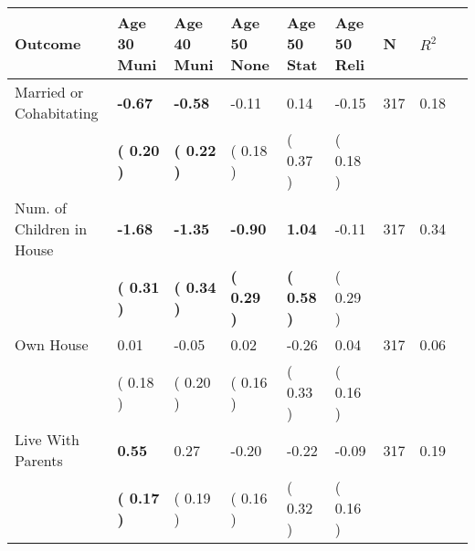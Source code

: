 \begin{tabular}{L{6.2cm} C{1.8cm} C{1.8cm} C{1.8cm} C{1.8cm} C{1.8cm} C{1.8cm} C{0.3cm} C{0.3cm}}
\toprule
 \textbf{Outcome} & \textbf{Age 30 Muni} & \textbf{Age 40 Muni} & \textbf{Age 50 None} & \textbf{Age 50 Stat} & \textbf{Age 50 Reli} & \textbf{N} & \textbf{$ R^2$} \\
\midrule
Married or Cohabitating & \textbf{    -0.67} & \textbf{    -0.58} &     -0.11 &      0.14 &     -0.15  & 317 &       0.18 \\ 
 & \textbf{(     0.20 )} & \textbf{(     0.22 )} & (     0.18 ) & (     0.37 ) & (     0.18 )  & \\
Num. of Children in House & \textbf{    -1.68} & \textbf{    -1.35} & \textbf{    -0.90} & \textbf{     1.04} &     -0.11  & 317 &       0.34 \\ 
 & \textbf{(     0.31 )} & \textbf{(     0.34 )} & \textbf{(     0.29 )} & \textbf{(     0.58 )} & (     0.29 )  & \\
Own House &      0.01 &     -0.05 &      0.02 &     -0.26 &      0.04  & 317 &       0.06 \\ 
 & (     0.18 ) & (     0.20 ) & (     0.16 ) & (     0.33 ) & (     0.16 )  & \\
Live With Parents & \textbf{     0.55} &      0.27 &     -0.20 &     -0.22 &     -0.09  & 317 &       0.19 \\ 
 & \textbf{(     0.17 )} & (     0.19 ) & (     0.16 ) & (     0.32 ) & (     0.16 )  & \\
\bottomrule
\end{tabular}
